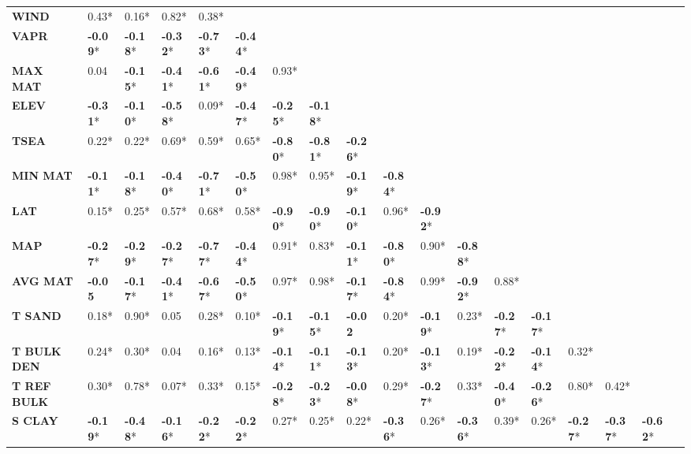 \documentclass[AutoFakeBold]{LZUThesis-PgD&PhD}
\begin{document}
\begin{table}[H]
\begin{tabular}{p{1.6cm}p{0.68cm}p{0.68cm}p{0.68cm}p{0.68cm}p{0.68cm}p{0.68cm}p{0.68cm}p{0.68cm}p{0.68cm}p{0.68cm}p{0.68cm}p{0.68cm}p{0.68cm}p{0.68cm}p{0.68cm}p{0.68cm}p{0.68cm}}
			\textbf{WIND} & 0.43* & 0.16* & 0.82* & 0.38* &  &  &  &  &  &  &  &  &  &  &  &  &  \\
			\textbf{VAPR} & \textbf{-0.09}* & \textbf{-0.18}* & \textbf{-0.32}* & \textbf{-0.73}* & \textbf{-0.44}* &  &  &  &  &  &  &  &  &  &  &  &  \\
			\textbf{MAX MAT} & 0.04 & \textbf{-0.15}* & \textbf{-0.41}* & \textbf{-0.61}* & \textbf{-0.49}* & 0.93* &  &  &  &  &  &  &  &  &  &  &  \\
			\textbf{ELEV} & \textbf{-0.31}* & \textbf{-0.10}* & \textbf{-0.58}* & 0.09* & \textbf{-0.47}* & \textbf{-0.25}* & \textbf{-0.18}* &  &  &  &  &  &  &  &  &  &  \\
			\textbf{TSEA} & 0.22* & 0.22* & 0.69* & 0.59* & 0.65* & \textbf{-0.80}* & \textbf{-0.81}* & \textbf{-0.26}* &  &  &  &  &  &  &  &  &  \\
			\textbf{MIN MAT} & \textbf{-0.11}* & \textbf{-0.18}* & \textbf{-0.40}* & \textbf{-0.71}* & \textbf{-0.50}* & 0.98* & 0.95* & \textbf{-0.19}* & \textbf{-0.84}* &  &  &  &  &  &  &  &  \\
			\textbf{LAT} & 0.15* & 0.25* & 0.57* & 0.68* & 0.58* & \textbf{-0.90}* & \textbf{-0.90}* & \textbf{-0.10}* & 0.96* & \textbf{-0.92}* &  &  &  &  &  &  &  \\
			\textbf{MAP} & \textbf{-0.27}* & \textbf{-0.29}* & \textbf{-0.27}* & \textbf{-0.77}* & \textbf{-0.44}* & 0.91* & 0.83* & \textbf{-0.11}* & \textbf{-0.80}* & 0.90* & \textbf{-0.88}* &  &  &  &  &  &  \\
			\textbf{AVG MAT} & \textbf{-0.05} & \textbf{-0.17}* & \textbf{-0.41}* & \textbf{-0.67}* & \textbf{-0.50}* & 0.97* & 0.98* & \textbf{-0.17}* & \textbf{-0.84}* & 0.99* & \textbf{-0.92}* & 0.88* &  &  &  &  &  \\
			\textbf{T SAND} & 0.18* & 0.90* & 0.05 & 0.28* & 0.10* & \textbf{-0.19}* & \textbf{-0.15}* & \textbf{-0.02} & 0.20* & \textbf{-0.19}* & 0.23* & \textbf{-0.27}* & \textbf{-0.17}* &  &  &  &  \\
			\textbf{T BULK DEN} & 0.24* & 0.30* & 0.04 & 0.16* & 0.13* & \textbf{-0.14}* & \textbf{-0.11}* & \textbf{-0.13}* & 0.20* & \textbf{-0.13}* & 0.19* & \textbf{-0.22}* & \textbf{-0.14}* & 0.32* &  &  &  \\
			\textbf{T REF BULK} & 0.30* & 0.78* & 0.07* & 0.33* & 0.15* & \textbf{-0.28}* & \textbf{-0.23}* & \textbf{-0.08}* & 0.29* & \textbf{-0.27}* & 0.33* & \textbf{-0.40}* & \textbf{-0.26}* & 0.80* & 0.42* &  &  \\
			\textbf{S CLAY} & \textbf{-0.19}* & \textbf{-0.48}* & \textbf{-0.16}* & \textbf{-0.22}* & \textbf{-0.22}* & 0.27* & 0.25* & 0.22* & \textbf{-0.36}* & 0.26* & \textbf{-0.36}* & 0.39* & 0.26* & \textbf{-0.27}* & \textbf{-0.37}* & \textbf{-0.62}* &  \\

\end{tabular}
\end{table}
\end{document}
